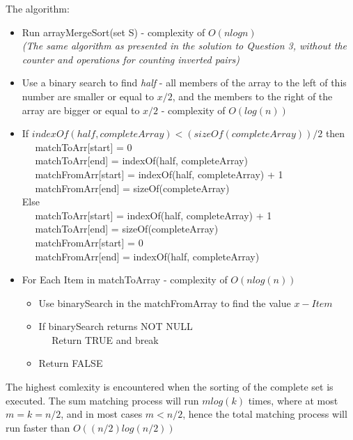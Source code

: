 \documentclass{article}
\begin{document}
The algorithm:
\begin{itemize}
  \item Run arrayMergeSort(set S) - complexity of $O(n log{n})$\\
  \textit{(The same algorithm as presented in the solution to Question 3, without the counter and operations for counting
  inverted pairs)}
  \item Use a binary search to find \textit{half} - all members of the
  array to the left of this number are smaller or equal to $x/2$, and the
  members to the right of the array are bigger or equal to $x/2$ - complexity of
  $O(log(n))$
  \item If $indexOf(half, completeArray) < (sizeOf(completeArray))/2$ then\\
  $\quad$ matchToArr[start] = 0\\
  $\quad$ matchToArr[end] = indexOf(half, completeArray)\\
  $\quad$ matchFromArr[start] = indexOf(half, completeArray) + 1\\
  $\quad$ matchFromArr[end] =   sizeOf(completeArray)\\
  Else\\
  $\quad$ matchToArr[start] = indexOf(half, completeArray) + 1\\
  $\quad$ matchToArr[end] =   sizeOf(completeArray)\\
  $\quad$ matchFromArr[start] = 0\\
  $\quad$ matchFromArr[end] = indexOf(half, completeArray)\\
  \item For Each Item in matchToArray - complexity of $O(n log(n))$
  \begin{itemize}
    \item Use binarySearch in the matchFromArray to find the value $x - Item$
    \item If binarySearch returns NOT NULL\\
    $\quad$ Return TRUE and break   
    \item Return FALSE
  \end{itemize} 
\end{itemize}

The highest comlexity is encountered when the sorting of the complete set is
executed. The sum  matching process will run $m log(k)$ times, where at most $m
= k = n/2$, and in most cases $m < n/2$, hence the total matching process will
run faster than $O((n/2) log (n/2))$

\vfill
\end{document}
